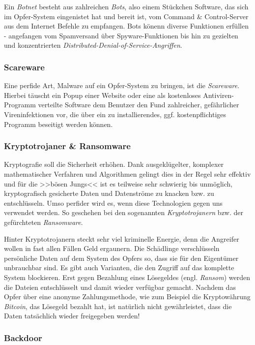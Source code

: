 Ein \textit{Botnet} besteht aus zahlreichen \textit{Bots}, also einem Stückchen Software, das sich im Opfer-System eingenistet hat und bereit ist, vom Command \& Control-Server aus dem Internet Befehle zu empfangen. Bots könenn diverse Funktionen erfüllen - angefangen vom Spamversand über Spyware-Funktionen bis hin zu gezielten und konzentrierten \textit{Distributed-Denial-of-Service-Angriffen}.

\subsubsection{Scareware}
\label{sec:Scareware}

Eine perfide Art, Malware auf ein Opfer-System zu bringen, ist die \textit{Scareware}. Hierbei täuscht ein Popup einer Website oder eine als kostenloses Antiviren-Programm verteilte Software dem Benutzer den Fund zahlreicher, gefährlicher Vireninfektionen vor, die über ein zu installierendes, ggf. kostenpflichtiges Programm beseitigt werden können.


\subsubsection{Kryptotrojaner \& Ransomware}
\label{sec:Ransomware}

Kryptografie soll die Sicherheit erhöhen. Dank ausgeklügelter, komplexer mathematischer Verfahren und Algorithmen gelingt dies in der Regel sehr effektiv und für die >>bösen Jungs<< ist es teilweise sehr schwierig bis unmöglich, kryptografisch gesicherte Daten und Datenströme zu knacken bzw. zu entschlüsseln. Umso perfider wird es, wenn diese Technologien gegen uns verwendet werden. So geschehen bei den sogenannten \textit{Kryptotrojanern} bzw. der gefürchteten \textit{Ransomware}.

Hinter Kryptotrojanern steckt sehr viel kriminelle Energie, denn die Angreifer wollen in fast allen Fällen Geld ergaunern. Die Schädlinge verschlüsseln persönliche Daten auf dem System des Opfers so, dass sie für den Eigentümer unbrauchbar sind. Es gibt auch Varianten, die den Zugriff auf das komplette System blockieren. Erst gegen Bezahlung eines Lösegeldes (engl. \textit{Ransom}) werden die Dateien entschlüsselt und damit wieder verfügbar gemacht. Nachdem das Opfer über eine anonyme Zahlungsmethode, wie zum Beispiel die Kryptowährung \textit{Bitcoin}, das Lösegeld bezahlt hat, ist natürlich nicht gewährleistet, dass die Daten tatsächlich wieder freigegeben werden!

\subsubsection{Backdoor}
\label{sec:Backdoor}

